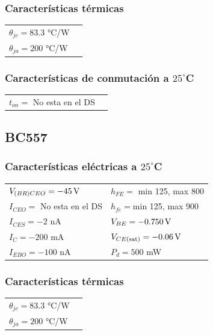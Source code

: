 \documentclass[chaptersright]{informeutn}
\begin{document}
    \subsubsection{Características térmicas}
    \begin{tabular}{ll}
    $\theta_{jc} = 83.3$ °C/W \\
    $\theta_{ja} = 200$ °C/W\\
    \end{tabular}
    
    \subsubsection{Características de conmutación a $25^\circ$C}
    \begin{tabular}{ll}
    $t_{on} = $ No esta en el DS \\
    \end{tabular}


  \subsection{BC557}

    \subsubsection{Características eléctricas a $25^\circ$C}
    \begin{tabular}{ll}
    $V_{(BR)CEO} =  -45 \,\mathrm{V}$         & \hspace{2cm} $h_{FE} =$ min 125, max 800 \\
    $I_{CEO} = $ No esta en el DS           & \hspace{2cm} $h_{fe} = $min 125, max 900 \\
    $I_{CES} = -2 $ nA             & \hspace{2cm} $V_{BE} = -0.750 \,\mathrm{V} $ \\
    $I_C = -200$ mA                & \hspace{2cm} $V_{CE(\text{sat})} =-0.06 \,\mathrm{V} $ \\
    $I_{EBO} = -100$ nA              & \hspace{2cm} $P_d = 500$ mW \\
    \end{tabular}
    
    \subsubsection{Características térmicas}
    \begin{tabular}{ll}
    $\theta_{jc} = 83.3$ °C/W \\
    $\theta_{ja} = 200$ °C/W\\
    \end{tabular}
    
\end{document}
